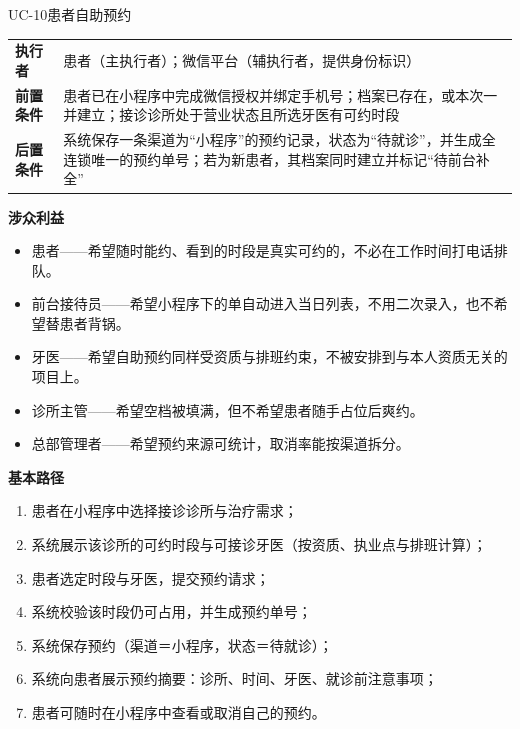 \documentclass[11pt,a4paper]{ctexart}
\begin{document}
\begin{ucbox}{UC-10\quad 患者自助预约}
\small
\begin{tabularx}{\linewidth}{@{}L{2.2cm}X@{}}
\toprule
\textbf{\textcolor{adcblue!92}{执行者}} & 患者（主执行者）；微信平台（辅执行者，提供身份标识） \\
\textbf{前置条件} & 患者已在小程序中完成微信授权并绑定手机号；档案已存在，或本次一并建立；接诊诊所处于营业状态且所选牙医有可约时段 \\
\textbf{后置条件} & 系统保存一条渠道为“小程序”的预约记录，状态为“待就诊”，并生成全连锁唯一的预约单号；若为新患者，其档案同时建立并标记“待前台补全” \\
\bottomrule
\end{tabularx}

\vspace{4pt}
\textbf{涉众利益}
\begin{itemize}[leftmargin=1.4em,topsep=2pt,itemsep=1pt]
  \item 患者——希望随时能约、看到的时段是真实可约的，不必在工作时间打电话排队。
  \item 前台接待员——希望小程序下的单自动进入当日列表，不用二次录入，也不希望替患者背锅。
  \item 牙医——希望自助预约同样受资质与排班约束，不被安排到与本人资质无关的项目上。
  \item 诊所主管——希望空档被填满，但不希望患者随手占位后爽约。
  \item 总部管理者——希望预约来源可统计，取消率能按渠道拆分。
\end{itemize}

\vspace{2pt}
\textbf{基本路径}
\begin{enumerate}[leftmargin=1.9em,topsep=2pt,itemsep=1pt]
  \item 患者在小程序中选择接诊诊所与治疗需求；
  \item 系统展示该诊所的可约时段与可接诊牙医（按资质、执业点与排班计算）；
  \item 患者选定时段与牙医，提交预约请求；
  \item 系统校验该时段仍可占用，并生成预约单号；
  \item 系统保存预约（渠道＝小程序，状态＝待就诊）；
  \item 系统向患者展示预约摘要：诊所、时间、牙医、就诊前注意事项；
  \item 患者可随时在小程序中查看或取消自己的预约。
\end{enumerate}


\end{ucbox}
\end{document}

